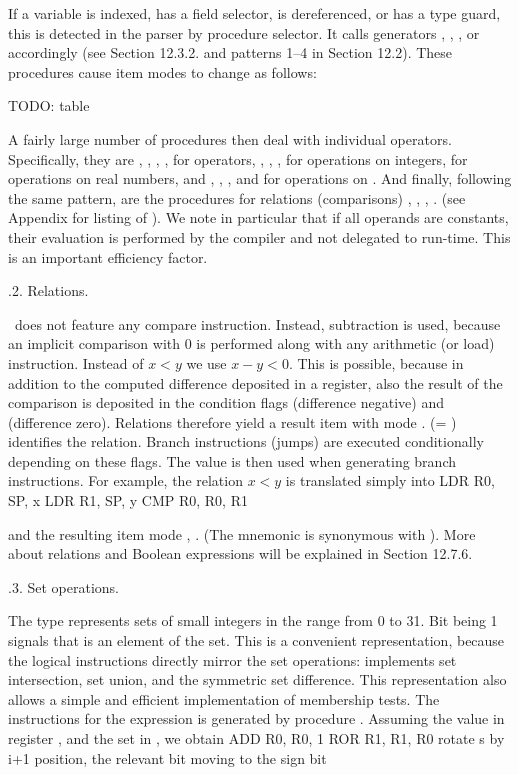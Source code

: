 If a variable is indexed, has a field selector, is dereferenced, or has a type guard, this is detected in the parser by procedure selector. It calls generators , , , or  accordingly (see Section 12.3.2. and patterns 1--4 in Section 12.2). These procedures cause item modes to change as follows:

TODO: table

A fairly large number of procedures then deal with individual operators. Specifically, they are , , , ,  for  operators, , , ,  for operations on integers,  for operations on real numbers, and , , , and  for operations on . And finally, following the same pattern, are the procedures for relations (comparisons) , , , . (see Appendix for listing of ). We note in particular that if all operands are constants, their evaluation is performed by the compiler and not delegated to run-time. This is an important efficiency factor.

.2. Relations.

\RISC\ does not feature any compare instruction. Instead, subtraction is used, because an implicit comparison with 0 is performed along with any arithmetic (or load) instruction. Instead of $x < y$ we use $x-y < 0$. This is possible, because in addition to the computed difference deposited in a register, also the result of the comparison is deposited in the condition flags  (difference negative) and  (difference zero). Relations therefore yield a result item  with mode .  (= ) identifies the relation. Branch instructions (jumps) are executed conditionally depending on these flags. The value  is then used when generating branch instructions. For example, the relation $x < y$ is translated simply into
\begintt
LDR R0, SP, x
LDR R1, SP, y
CMP R0, R0, R1
\endtt

\noindent and the resulting item mode , . (The mnemonic  is synonymous with ). More about relations and Boolean expressions will be explained in Section 12.7.6.

.3. Set operations.

The type  represents sets of small integers in the range from 0 to 31. Bit  being 1 signals that  is an element of the set. This is a convenient representation, because the logical instructions directly mirror the set operations:  implements set intersection,  set union, and  the symmetric set difference. This representation also allows a simple and efficient implementation of membership tests. The instructions for the expression  is generated by procedure . Assuming the value  in register , and the set  in , we obtain
\begintt
ADD R0, R0, 1
ROR R1, R1, R0 rotate s by i+1 position, the relevant bit moving to the sign bit
\endtt

